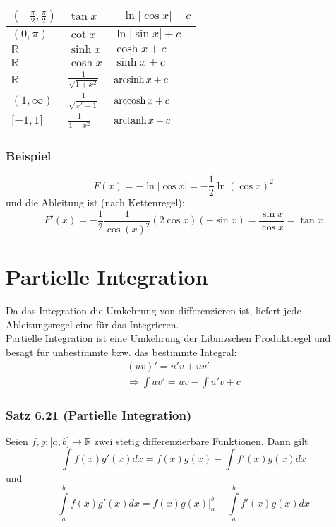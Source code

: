 \begin{tabularx}{\textwidth}{|Y|Y|Y|}
$(-\frac{\pi}{2},\frac{\pi}{2})$        & $\tan{x}$                             & $- \ln \left| {\cos x} \right| + c$                                                                \\ [1.5ex]\hline
$(0,\pi)$        & $\cot{x}$                             & $\ln \left| {\sin x} \right| + c$                                                                \\[1.5ex]\hline
$\mathbb{R}$ & $\sinh x$ & $\cosh x + c$\\[1.5ex]\hline
$\mathbb{R}$ & $\cosh x$ & $\sinh x + c$\\[1.5ex]\hline
$\mathbb{R}$ & $\frac{1}{\sqrt{1+x^2}}$  & $\operatorname{arcsinh} x + c$ \\[1.5ex]\hline
$(1,\infty)$ & $\frac{1}{\sqrt{x^2-1}}$ & $\operatorname{arccosh} x + c$ \\[1.5ex]\hline
$\lbrack -1,1\rbrack$ & $\frac{1}{1-x^2}$ & $\operatorname{arctanh} x + c$ \\[1.5ex]\hline
 \end{tabularx}

\subsubsection*{Beispiel}
$$F(x)=-\ln\left| \cos x \right| = -\frac{1}{2}\ln\left(\cos x\right)^2$$
und die Ableitung ist (nach Kettenregel):
\[F'(x) =  - \frac{1}{2}\frac{1}{{\cos {{(x)}^2}}}(2\cos x)( - \sin x) = \frac{{\sin x}}{{\cos x}} = \tan x\]

\section{Partielle Integration}
Da das Integration die Umkehrung von differenzieren ist, liefert jede Ableitungsregel eine für das Integrieren.\\

Partielle Integration ist eine Umkehrung der Libnizschen Produktregel und besagt für unbestimmte bzw. das bestimmte Integral:
\[\begin{array}{c}
(uv)' = u'v + uv'\\
 \Rightarrow \int {uv'}  = uv - \int {u'v}  + c
\end{array}\]

\subsubsection*{Satz 6.21 (Partielle Integration)}
Seien $f,g:\lbrack a,b\rbrack\rightarrow\mathbb{R}$ zwei stetig differenzierbare Funktionen. Dann gilt 
\[\int {f(x)g'(x)dx = f(x)g(x) - \int {f'(x)g(x)dx} } \]
und
\[\int\limits_a^b {f(x)g'(x)dx = \left. {f(x)g(x)} \right|_a^b - \int\limits_a^b {f'(x)g(x)dx} } \]
